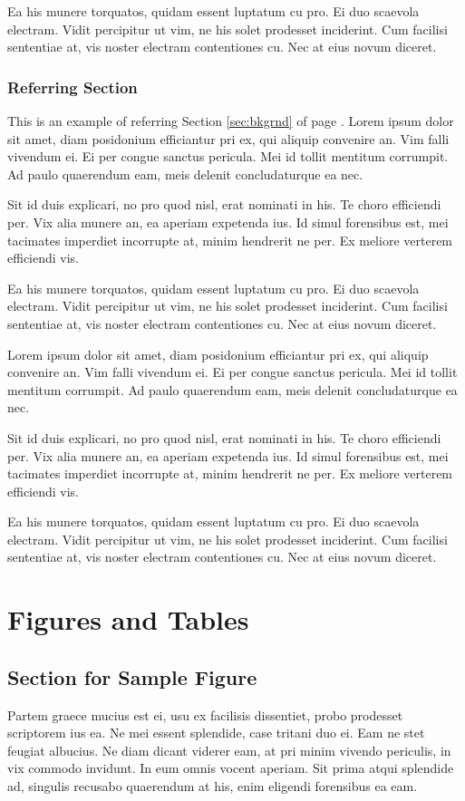 Ea his munere torquatos, quidam essent luptatum cu pro. Ei duo scaevola electram. Vidit percipitur ut vim, ne his solet prodesset inciderint. Cum facilisi sententiae at, vis noster electram contentiones cu. Nec at eius novum diceret.
\subsection{Referring Section}
This is an example of referring Section \ref{sec:bkgrnd} of page \pageref{sec:bkgrnd}. Lorem ipsum dolor sit  amet, diam posidonium efficiantur pri ex, qui aliquip convenire an. Vim falli vivendum ei. Ei per congue sanctus pericula. Mei id tollit mentitum corrumpit. Ad paulo quaerendum eam, meis delenit concludaturque ea nec.\par
Sit id duis explicari, no pro quod nisl, erat nominati in his. Te choro efficiendi per. Vix alia munere an, ea aperiam expetenda ius. Id simul forensibus est, mei tacimates imperdiet incorrupte at, minim hendrerit ne per. Ex meliore verterem efficiendi vis.

Ea his munere torquatos, quidam essent luptatum cu pro. Ei duo scaevola electram. Vidit percipitur ut vim, ne his solet prodesset inciderint. Cum facilisi sententiae at, vis noster electram contentiones cu. Nec at eius novum diceret.

Lorem ipsum dolor sit  amet, diam posidonium efficiantur pri ex, qui aliquip convenire an. Vim falli vivendum ei. Ei per congue sanctus pericula. Mei id tollit mentitum corrumpit. Ad paulo quaerendum eam, meis delenit concludaturque ea nec.\par
Sit id duis explicari, no pro quod nisl, erat nominati in his. Te choro efficiendi per. Vix alia munere an, ea aperiam expetenda ius. Id simul forensibus est, mei tacimates imperdiet incorrupte at, minim hendrerit ne per. Ex meliore verterem efficiendi vis.

Ea his munere torquatos, quidam essent luptatum cu pro. Ei duo scaevola electram. Vidit percipitur ut vim, ne his solet prodesset inciderint. Cum facilisi sententiae at, vis noster electram contentiones cu. Nec at eius novum diceret.
\chapter{Figures and Tables}
\section{Section for Sample Figure}
Partem graece mucius est ei, usu ex facilisis dissentiet, probo prodesset scriptorem ius ea. Ne mei essent splendide, case tritani duo ei. Eam ne stet feugiat albucius. Ne diam dicant viderer eam, at pri minim vivendo periculis, in vix commodo invidunt. In eum omnis vocent aperiam. Sit prima atqui splendide ad, singulis recusabo quaerendum at his, enim eligendi forensibus ea eam.


